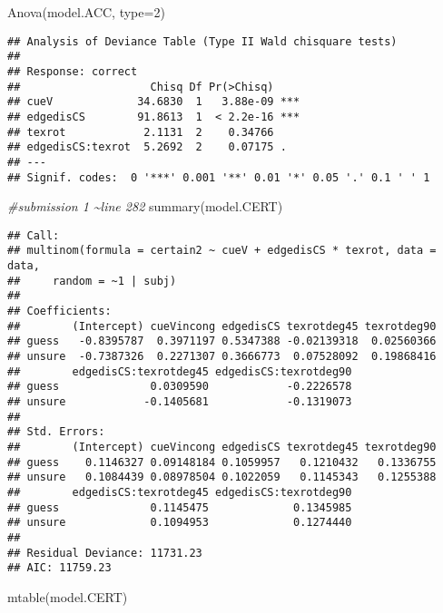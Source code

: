 \documentclass[
]{article}
\newenvironment{Shaded}{\begin{snugshade}}{\end{snugshade}}
\newcommand{\AttributeTok}[1]{\textcolor[rgb]{0.77,0.63,0.00}{#1}}
\newcommand{\CommentTok}[1]{\textcolor[rgb]{0.56,0.35,0.01}{\textit{#1}}}
\newcommand{\DecValTok}[1]{\textcolor[rgb]{0.00,0.00,0.81}{#1}}
\newcommand{\FunctionTok}[1]{\textcolor[rgb]{0.00,0.00,0.00}{#1}}
\newcommand{\NormalTok}[1]{#1}
\begin{document}
\begin{Shaded}
\begin{Highlighting}[]
\FunctionTok{Anova}\NormalTok{(model.ACC, }\AttributeTok{type=}\DecValTok{2}\NormalTok{) }
\end{Highlighting}
\end{Shaded}

\begin{verbatim}
## Analysis of Deviance Table (Type II Wald chisquare tests)
## 
## Response: correct
##                    Chisq Df Pr(>Chisq)    
## cueV             34.6830  1   3.88e-09 ***
## edgedisCS        91.8613  1  < 2.2e-16 ***
## texrot            2.1131  2    0.34766    
## edgedisCS:texrot  5.2692  2    0.07175 .  
## ---
## Signif. codes:  0 '***' 0.001 '**' 0.01 '*' 0.05 '.' 0.1 ' ' 1
\end{verbatim}

\begin{Shaded}
\begin{Highlighting}[]
\CommentTok{\#submission 1 \textasciitilde{}line 282}
\FunctionTok{summary}\NormalTok{(model.CERT)}
\end{Highlighting}
\end{Shaded}

\begin{verbatim}
## Call:
## multinom(formula = certain2 ~ cueV + edgedisCS * texrot, data = data, 
##     random = ~1 | subj)
## 
## Coefficients:
##        (Intercept) cueVincong edgedisCS texrotdeg45 texrotdeg90
## guess   -0.8395787  0.3971197 0.5347388 -0.02139318  0.02560366
## unsure  -0.7387326  0.2271307 0.3666773  0.07528092  0.19868416
##        edgedisCS:texrotdeg45 edgedisCS:texrotdeg90
## guess              0.0309590            -0.2226578
## unsure            -0.1405681            -0.1319073
## 
## Std. Errors:
##        (Intercept) cueVincong edgedisCS texrotdeg45 texrotdeg90
## guess    0.1146327 0.09148184 0.1059957   0.1210432   0.1336755
## unsure   0.1084439 0.08978504 0.1022059   0.1145343   0.1255388
##        edgedisCS:texrotdeg45 edgedisCS:texrotdeg90
## guess              0.1145475             0.1345985
## unsure             0.1094953             0.1274440
## 
## Residual Deviance: 11731.23 
## AIC: 11759.23
\end{verbatim}

\begin{Shaded}
\begin{Highlighting}[]
\FunctionTok{mtable}\NormalTok{(model.CERT)}
\end{Highlighting}
\end{Shaded}
\end{document}
